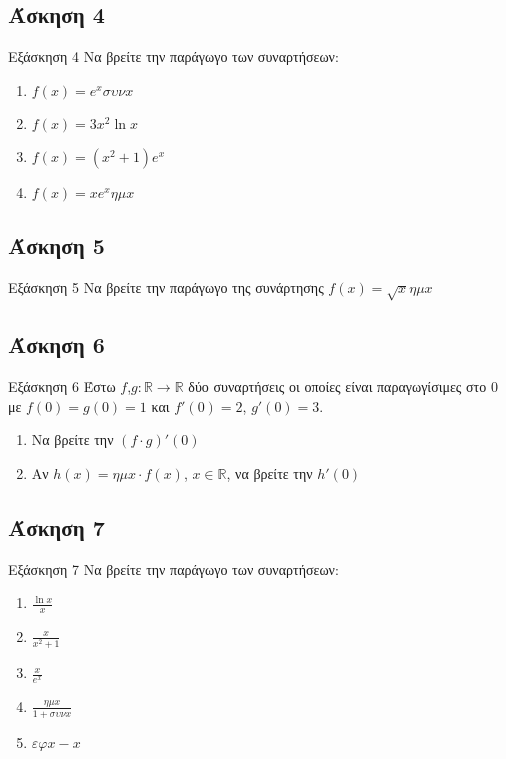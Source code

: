\documentclass[greek]{beamer}
\begin{document}
\subsection{Άσκηση 4}
\begin{frame}[label=Άσκηση4]{Εξάσκηση 4}
 Να βρείτε την παράγωγο των συναρτήσεων:
 \begin{enumerate}
  \item<1-> $f(x)=e^xσυνx$
  \item<2-> $f(x)=3x^2\ln x$
  \item<3-> $f(x)=(x^2+1)e^x$
  \item<4-> $f(x)=xe^xημx$
 \end{enumerate}

\end{frame}

\subsection{Άσκηση 5}
\begin{frame}[label=Άσκηση5]{Εξάσκηση 5}
 Να βρείτε την παράγωγο της συνάρτησης $f(x)=\sqrt{x}ημx$

\end{frame}

\subsection{Άσκηση 6}
\begin{frame}[label=Άσκηση6]{Εξάσκηση 6}
 Έστω $f$,$g:\mathbb{R}\to\mathbb{R}$ δύο συναρτήσεις οι οποίες είναι παραγωγίσιμες στο $0$ με $f(0)=g(0)=1$ και $f'(0)=2$, $g'(0)=3$.

 \begin{enumerate}
  \item<1-> Να βρείτε την $(f\cdot g)'(0)$
  \item<2-> Αν $h(x)=ημx \cdot f(x)$, $x\in\mathbb{R}$, να βρείτε την $h'(0)$
 \end{enumerate}

\end{frame}

\subsection{Άσκηση 7}
\begin{frame}[label=Άσκηση7]{Εξάσκηση 7}
 Να βρείτε την παράγωγο των συναρτήσεων:
 \begin{enumerate}
  \item<1-> $\frac{\ln x}{x}$
  \item<2-> $\frac{x}{x^2+1}$
  \item<3-> $\frac{x}{e^x}$
  \item<4-> $\frac{ημx}{1+συνx}$
  \item<5-> $εφx-x$
 \end{enumerate}

\end{frame}
\end{document}
